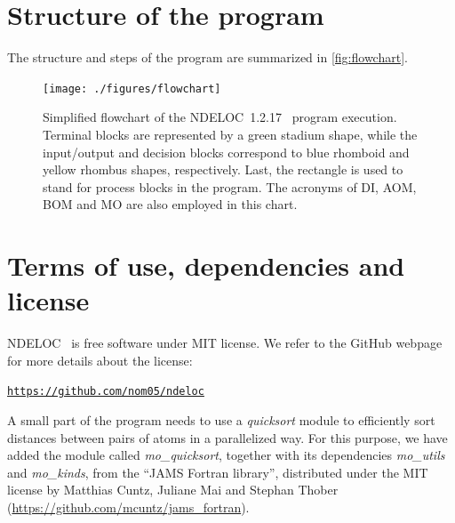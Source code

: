 \documentclass[a4paper,11pt,openany]{memoir}
\newcommand\versionprog{1.2.17}
\newcommand\programa{\textsc{NDELOC}}
\begin{document}
\section{Structure of the program}
The structure and steps of the program are summarized in \autoref{fig:flowchart}.

\begin{figure}
	\begin{center}
		\texttt{[image: ./figures/flowchart]}
		\caption{Simplified flowchart of the \programa~\versionprog~ program execution. Terminal blocks are represented by a green stadium shape, while the input/output and decision blocks correspond to blue rhomboid and yellow rhombus shapes, respectively. Last, the rectangle is used to stand for process blocks in the program. The acronyms of \acf{DI}, \acf{AOM}, \acf{BOM} and \acf{MO} are also employed in this chart.}\label{fig:flowchart}
	\end{center}
\end{figure}

\section{Terms of use, dependencies and license}
\programa~ is free software under MIT license. We refer to the GitHub webpage for more details about the license:
\begin{center}
	\texttt{\url{https://github.com/nom05/ndeloc}}
\end{center}

A small part of the program needs to use a \emph{quicksort} module to efficiently sort distances between pairs of atoms in a parallelized way. For this purpose, we have added the module called \emph{mo\_quicksort}, together with its dependencies \emph{mo\_utils} and \emph{mo\_kinds}, from the ``JAMS Fortran library'', distributed under the MIT license by Matthias Cuntz, Juliane Mai and Stephan Thober (\url{https://github.com/mcuntz/jams_fortran}).
\end{document}
